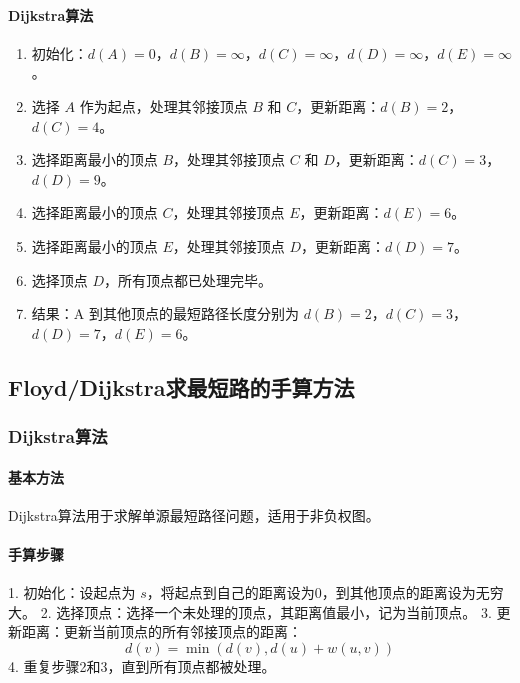 \documentclass[UTF8]{ctexart}
\begin{document}
\paragraph{Dijkstra算法}
\begin{enumerate}
    \item 初始化：\( d(A) = 0 \)，\( d(B) = \infty \)，\( d(C) = \infty \)，\( d(D) = \infty \)，\( d(E) = \infty \)。
    \item 选择 \( A \) 作为起点，处理其邻接顶点 \( B \) 和 \( C \)，更新距离：\( d(B) = 2 \)，\( d(C) = 4 \)。
    \item 选择距离最小的顶点 \( B \)，处理其邻接顶点 \( C \) 和 \( D \)，更新距离：\( d(C) = 3 \)，\( d(D) = 9 \)。
    \item 选择距离最小的顶点 \( C \)，处理其邻接顶点 \( E \)，更新距离：\( d(E) = 6 \)。
    \item 选择距离最小的顶点 \( E \)，处理其邻接顶点 \( D \)，更新距离：\( d(D) = 7 \)。
    \item 选择顶点 \( D \)，所有顶点都已处理完毕。
    \item 结果：A 到其他顶点的最短路径长度分别为 \( d(B) = 2 \)，\( d(C) = 3 \)，\( d(D) = 7 \)，\( d(E) = 6 \)。
\end{enumerate}

\subsection{Floyd/Dijkstra求最短路的手算方法}
\subsubsection{Dijkstra算法}
\paragraph{基本方法}
Dijkstra算法用于求解单源最短路径问题，适用于非负权图。
\paragraph{手算步骤}
1. 初始化：设起点为 \(s\)，将起点到自己的距离设为0，到其他顶点的距离设为无穷大。
2. 选择顶点：选择一个未处理的顶点，其距离值最小，记为当前顶点。
3. 更新距离：更新当前顶点的所有邻接顶点的距离：
\[
d(v) = \min(d(v), d(u) + w(u, v))
\]
4. 重复步骤2和3，直到所有顶点都被处理。
\end{document}
